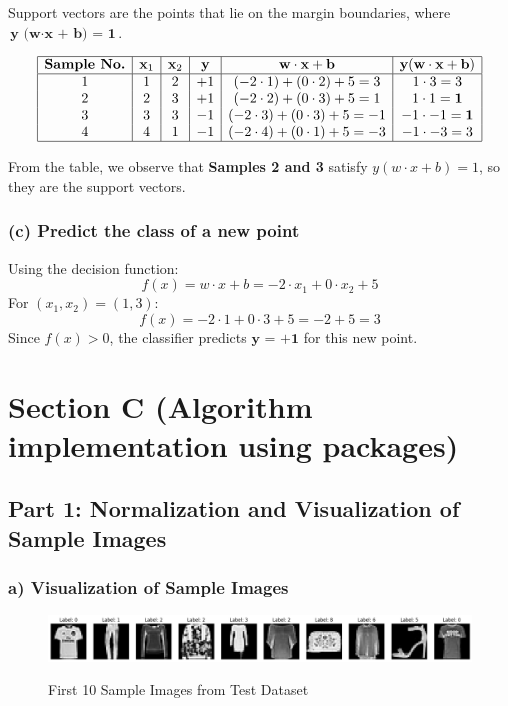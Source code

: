\documentclass{article}
\begin{document}
Support vectors are the points that lie on the margin boundaries, where \( \textbf{y (w} \cdot \textbf{x + b) = 1} \).

\[
\begin{array}{|c|c|c|c|c|c|}
\hline
\textbf{Sample No.} & \textbf{x}_1 & \textbf{x}_2 & \textbf{y} & \textbf{w} \cdot \textbf{x} + \textbf{b} & \textbf{y} (\textbf{w} \cdot \textbf{x} + \textbf{b}) \\
\hline
1 & 1 & 2 & +1 & (-2 \cdot 1) + (0 \cdot 2) + 5 = 3 & 1 \cdot 3 = 3 \\
2 & 2 & 3 & +1 & (-2 \cdot 2) + (0 \cdot 3) + 5 = 1 & 1 \cdot 1 = \textbf{1} \\
3 & 3 & 3 & -1 & (-2 \cdot 3) + (0 \cdot 3) + 5 = -1 & -1 \cdot -1 = \textbf{1} \\
4 & 4 & 1 & -1 & (-2 \cdot 4) + (0 \cdot 1) + 5 = -3 & -1 \cdot -3 = 3 \\
\hline
\end{array}
\]

From the table, we observe that \textbf{Samples 2 and 3} satisfy \( y (w \cdot x + b) = 1 \), so they are the support vectors.


\subsubsection*{(c) Predict the class of a new point}
Using the decision function:
\[
f(x) = w \cdot x + b = -2 \cdot x_1 + 0 \cdot x_2 + 5
\]
For \( (x_1, x_2) = (1, 3) \):
\[
f(x) = -2 \cdot 1 + 0 \cdot 3 + 5 = -2 + 5 = 3
\]
Since \( f(x) > 0 \), the classifier predicts \( \textbf{y = +1} \) for this new point.


\vspace{10pt} %
\section{Section C (Algorithm implementation using packages)}
\subsection*{Part 1: Normalization and Visualization of Sample Images}
\subsubsection*{a) Visualization of Sample Images}
\begin{figure}[H] %
    \centering
    \begin{minipage}{1\linewidth}
        \centering
        \includegraphics[scale=0.4]{assets/sample_images.png}
        \caption{First 10 Sample Images from Test Dataset}{}
        \label{fig:1c}
    \end{minipage}
\end{figure}
\end{document}

